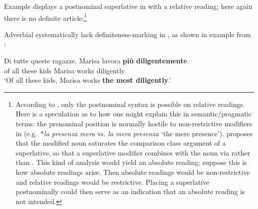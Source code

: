 \documentclass[output=paper
,modfonts
,nonflat]{langsci/langscibook}
\begin{document}
Example  displays a postnominal superlative in  with a relative reading; here again there is no definite article:\footnote{According to \citet[11--12]{Cinque2010}, only the postnominal syntax is possible on relative readings.  Here is a speculation as to how one might explain this in semantic/pragmatic terms: the prenominal position is normally hostile to non-restrictive modifiers in  (e.g.\ *\textit{la presenza mera} vs. \textit{la mera presenza} `the mere presence'). \citet{Matushansky2008a} proposes that the modified noun saturates the comparison class argument of a superlative, so that a superlative modifier combines with the noun via  rather than . This kind of analysis would yield an absolute reading; suppose this is how absolute readings arise. Then absolute readings would be non-restrictive and relative readings would be restrictive. Placing a superlative postnominally could then serve as an indication that an absolute reading is not intended.}

\ea \label{ex:coppockstrand:60}
\begin{xlist}
\end{xlist}
\z

Adverbial  systematically lack definiteness-marking in , as shown in example  from \citet[53]{deBoer1986}:

\ea \label{ex:coppockstrand:61}
\gll Di tutte queste ragazze, Marisa lavora \textbf{più} \textbf{diligentemente}.\\ 
of all these kids Marisa works \cmpr{} diligently\\ 
\glt`Of all these kids, Marisa works \textbf{the most diligently}.'
\z
\end{document}
